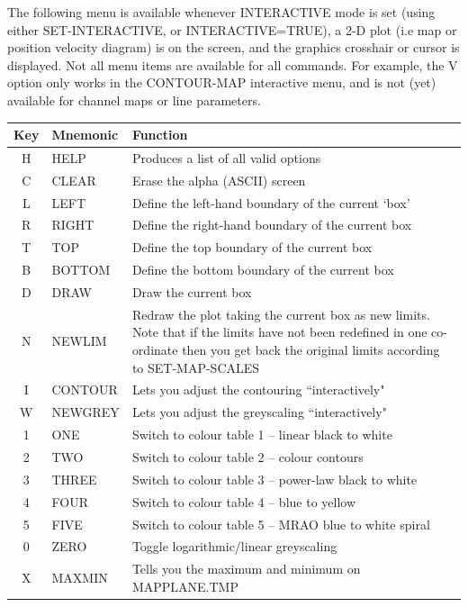 \documentclass[11pt,twoside]{report}
\begin{document}
The following menu is available whenever INTERACTIVE mode is set (using
either SET-INTERACTIVE, or INTERACTIVE=TRUE), a 2-D plot (i.e map or
position velocity diagram) is on the screen, and the graphics crosshair
or cursor is displayed. Not all menu items are available for all commands.
For example, the V option only works in the CONTOUR-MAP interactive menu,
and is not (yet) available for channel maps or line parameters.

\begin{table}[htbp]
\begin{center}
\begin{tabular}{|c|l|l|} \hline
Key & Mnemonic & Function \\ \hline
H &HELP &Produces a list of all valid options\\
C &CLEAR &Erase the alpha (ASCII) screen\\
L &LEFT &Define the left-hand boundary of the current `box'\\
R &RIGHT &Define the right-hand boundary of the current box\\
T &TOP &Define the top boundary of the current box\\
B &BOTTOM &Define the bottom boundary of the current box\\
D &DRAW &Draw the current box\\
N & NEWLIM & \parbox[t]{3.7in}{ Redraw the plot taking the current box as new 
                      limits. Note that if the limits have not been
                      redefined in one co-ordinate then you get back the
                      original limits according to SET-MAP-SCALES} \\
I & CONTOUR & Lets you adjust the contouring ``interactively"\\
W & NEWGREY & Lets you adjust the greyscaling ``interactively"\\
1 & ONE     & Switch to colour table 1 -- linear black to white\\
2 & TWO     & Switch to colour table 2 -- colour contours\\
3 & THREE   & Switch to colour table 3 -- power-law black to white\\
4 & FOUR    & Switch to colour table 4 -- blue to yellow\\
5 & FIVE    & Switch to colour table 5 -- MRAO blue to white spiral\\
0 & ZERO    & Toggle logarithmic/linear greyscaling\\
X & MAXMIN & Tells you the maximum and minimum on MAPPLANE.TMP\\

\end{tabular}
\end{center}
\end{table}
\end{document}
